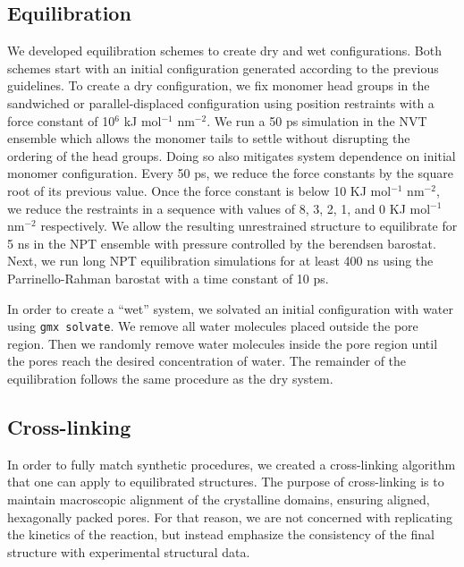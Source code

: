 \documentclass[journal=jpcbfk,manusciprt=article]{achemso}
\begin{document}
  \subsection{Equilibration}

  We developed equilibration schemes to create dry and wet configurations. Both
  schemes start with an initial configuration generated according to the previous
  guidelines. To create a dry configuration, we fix monomer head groups in the
  sandwiched or parallel-displaced configuration using position restraints with a
  force constant of 10$^6$ kJ mol$^{-1}$ nm$^{-2}$. We run a 50 ps simulation in
  the NVT ensemble which allows the monomer tails to settle without disrupting
  the ordering of the head groups. Doing so also mitigates system dependence on
  initial monomer configuration. Every 50 ps, we reduce the force constants by
  the square root of its previous value. Once the force constant is below 10 KJ
  mol$^{-1}$ nm$^{-2}$, we reduce the restraints in a sequence with values of
  8, 3, 2, 1, and 0 KJ mol$^{-1}$ nm$^{-2}$ respectively. We allow the resulting
  unrestrained structure to equilibrate for 5 ns in the NPT ensemble
  with pressure controlled by the berendsen barostat. Next, we run long NPT
  equilibration simulations for at least 400 ns using the Parrinello-Rahman
  barostat with a time constant of 10 ps.

  In order to create a ``wet'' system, we solvated an initial configuration with
  water using \texttt{gmx solvate}. We remove all water molecules placed outside
  the pore region. Then we randomly remove water molecules inside the pore region
  until the pores reach the desired concentration of water. The remainder of the
  equilibration follows the same procedure as the dry system. 

  \subsection{Cross-linking}
  
  In order to fully match synthetic procedures, we created a cross-linking
  algorithm that one can apply to equilibrated structures. The purpose of
  cross-linking is to maintain macroscopic alignment of the crystalline domains,
  ensuring aligned, hexagonally packed pores. For that reason, we are not
  concerned with replicating the kinetics of the reaction, but instead emphasize
  the consistency of the final structure with experimental structural data. 
\end{document}
